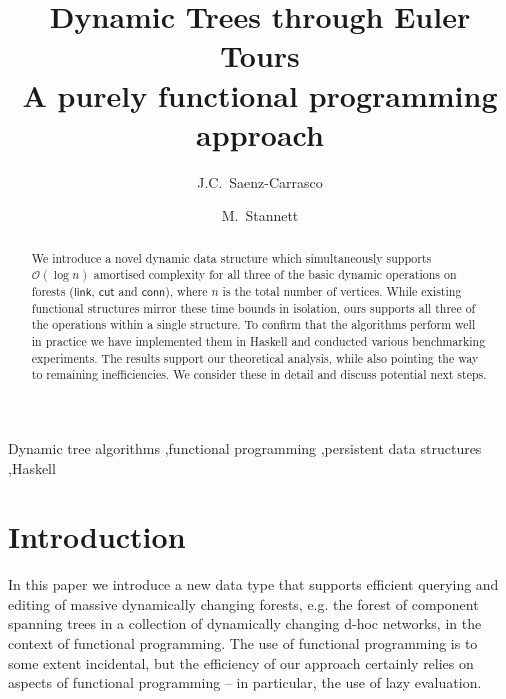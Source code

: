 \documentclass{elsarticle}
\newcommand{\MATHSF}[1]{\ensuremath{\mathsf{#1}}\xspace}
\newcommand{\link}{\MATHSF{link}}
\newcommand{\cut}{\MATHSF{cut}}
\newcommand{\conn}{\MATHSF{conn}}
\renewcommand{\O}{\ensuremath{\mathcal{O}}}
\begin{document}
\title{Dynamic Trees through Euler Tours\\%
\large{A purely functional programming approach}}

\author{J.C.~Saenz-Carrasco}

\author{M.~Stannett}

\address{Department of Computer Science,\\
Regent Court, 211 Portobello,\\
Sheffield S1 4DP, United Kingdom}


\begin{abstract}
We introduce a novel dynamic data structure which simultaneously supports $\O(\log n)$ amortised complexity for all three of the basic dynamic operations on forests (\link, \cut and \conn), where $n$ is the total number of vertices. While existing functional structures mirror these time bounds in isolation, ours supports all three of the operations within a single structure. To confirm that the algorithms perform well in practice we have implemented them in Haskell and conducted various benchmarking experiments. The results support our theoretical analysis, while also pointing the way to remaining inefficiencies. We consider these in detail and discuss potential next steps.
\end{abstract}

\begin{keyword}
Dynamic tree algorithms \sep functional programming \sep persistent data structures \sep Haskell
\end{keyword}


\maketitle

% 


\section{Introduction}
\label{sec:Intro}


In this paper we introduce a new data type that supports efficient querying and editing of massive dynamically changing forests, e.g. the forest of component spanning trees in a collection of dynamically changing d-hoc networks, in the context of functional programming. The use of functional programming is to some extent incidental, but the efficiency of our approach certainly relies on aspects of functional programming -- in particular, the use of lazy evaluation.
\end{document}
